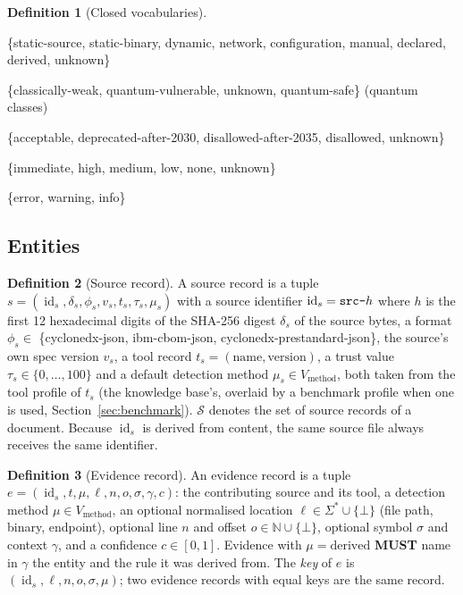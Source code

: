 \documentclass[11pt,a4paper]{article}
\newcommand{\codem}[1]{\texttt{\detokenize{#1}}}
\newcommand{\MUST}{\textbf{MUST}}
\newcommand{\Srcs}{\mathcal{S}}
\newcommand{\Q}{\mathcal{Q}}
\newcommand{\id}{\operatorname{id}}
\theoremstyle{definition}
\newtheorem{definition}{Definition}[section]
\theoremstyle{plain}
\begin{document}
\begin{definition}[Closed vocabularies]
\begin{description}[nosep,leftmargin=2.6cm,style=nextline]
\item[$V_{\mathrm{method}}$] \{static-source, static-binary, dynamic, network, configuration, manual, declared, derived, unknown\}
\item[$\Q$] \{classically-weak, quantum-vulnerable, unknown, quantum-safe\} (quantum classes)
\item[$V_{\mathrm{ir}}$] \{acceptable, deprecated-after-2030, disallowed-after-2035, disallowed, unknown\}
\item[$V_{\mathrm{prio}}$] \{immediate, high, medium, low, none, unknown\}
\item[$V_{\mathrm{sev}}$] \{error, warning, info\}
\end{description}
\end{definition}

\subsection{Entities}
\begin{definition}[Source record]
A source record is a tuple $s = (\id_s, \delta_s, \phi_s, v_s, t_s, \tau_s, \mu_s)$ with a
source identifier $\id_s = \codem{src-}h$ where $h$ is the first 12 hexadecimal digits of the
SHA-256 digest $\delta_s$ of the source bytes, a format $\phi_s \in$ \{cyclonedx-json,
ibm-cbom-json, cyclonedx-prestandard-json\}, the source's own spec version $v_s$, a tool
record $t_s = (\text{name}, \text{version})$, a trust value $\tau_s \in \{0,\dots,100\}$ and a
default detection method $\mu_s \in V_{\mathrm{method}}$, both taken from the tool profile of
$t_s$ (the knowledge base's, overlaid by a benchmark profile when one is used,
Section~\ref{sec:benchmark}). $\Srcs$ denotes the set of source
records of a document. Because $\id_s$ is derived from content, the same source file always
receives the same identifier.
\end{definition}

\begin{definition}[Evidence record]\label{def:evidence}
An evidence record is a tuple $e = (\id_s, t, \mu, \ell, n, o, \sigma, \gamma, c)$: the
contributing source and its tool, a detection method $\mu \in V_{\mathrm{method}}$, an optional
normalised location $\ell \in \Sigma^{*} \cup \{\bot\}$ (file path, binary, endpoint), optional
line $n$ and offset $o \in \mathbb{N} \cup \{\bot\}$, optional symbol $\sigma$ and context
$\gamma$, and a confidence $c \in [0,1]$. Evidence with $\mu = \text{derived}$ \MUST{} name in
$\gamma$ the entity and the rule it was derived from. The \emph{key} of $e$ is
$(\id_s,\ell,n,o,\sigma,\mu)$; two evidence records with equal keys are the same record.
\end{definition}
\end{document}
